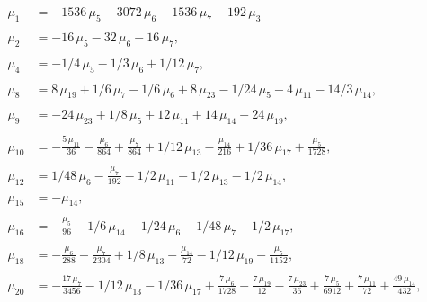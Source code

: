 \documentclass[a4paper,12pt, DIV=14, BCOR=5mm, twoside, headsepline]{scrbook}
\begin{document}
\begin{align}\label{AreaSol1}
    \begin{aligned}
\mu_{{1}}&=-1536\,\mu_{{5}}-3072\,\mu_{{6}}-1536\,\mu_{{7}}-
192\,\mu_{{3}}\\
\\
\mu_{{2}}&=-16\,\mu_{{5}}-32\,\mu_{{6}}-16\,\mu_{{7}},\\
\\
\mu_{{4}}&=-1/4\,\mu_{{5}}-1/3\,\mu_{{6}}+1/12\,\mu_{{7}}, \\
\\
\mu_{{8}}&=8\,
\mu_{{19}}+1/6\,\mu_{{7}}-1/6\,\mu_{{6}}+8\,\mu_{{23}}-1/24\,\mu_{{5}}
-4\,\mu_{{11}}-14/3\,\mu_{{14}}, \\
\\
\mu_{{9}}&=-24\,\mu_{{23}}+1/8\,\mu_{{5
}}+12\,\mu_{{11}}+14\,\mu_{{14}}-24\,\mu_{{19}}, \\
\\
\mu_{{10}}&=-{\frac {5
\,\mu_{{11}}}{36}}-{\frac {\mu_{{6}}}{864}}+{\frac {\mu_{{7}}}{864}}+1
/12\,\mu_{{13}}-{\frac {\mu_{{14}}}{216}}+1/36\,\mu_{{17}}+{\frac {\mu
_{{5}}}{1728}}, \\
\\
\mu_{{12}}&=1/48\,\mu_{{6}}-{\frac {\mu_{{7}}}{192}}-1/2
\,\mu_{{11}}-1/2\,\mu_{{13}}-1/2\,\mu_{{14}}, \\
\\
\mu_{{15}}&=-\mu_{{14}},\\
\\
\mu_{{16}}&=-{\frac {\mu_{{5}}}{96}}-1/6\,\mu_{{14}}-1/24\,\mu_{{6}}-1/
48\,\mu_{{7}}-1/2\,\mu_{{17}}, \\
\\
\mu_{{18}}&=-{\frac {\mu_{{6}}}{288}}-{
\frac {\mu_{{7}}}{2304}}+1/8\,\mu_{{13}}-{\frac {\mu_{{14}}}{72}}-1/12
\,\mu_{{19}}-{\frac {\mu_{{5}}}{1152}}, \\
\\
\mu_{{20}}&=-{\frac {17\,\mu_{{7
}}}{3456}}-1/12\,\mu_{{13}}-1/36\,\mu_{{17}}+{\frac {7\,\mu_{{6}}}{
1728}}-{\frac {7\,\mu_{{19}}}{12}}-{\frac {7\,\mu_{{23}}}{36}}+{\frac 
{7\,\mu_{{5}}}{6912}}+{\frac {7\,\mu_{{11}}}{72}}+{\frac {49\,\mu_{{14
}}}{432}},
\end{aligned}
\end{align}
\end{document}
